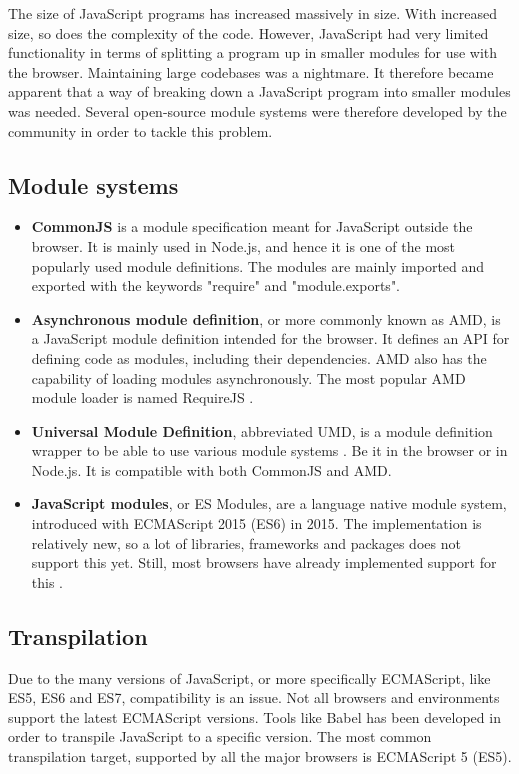 The size of JavaScript programs has increased massively in size. With increased size, so does the complexity of the code. However, JavaScript had very limited functionality in terms of splitting a program up in smaller modules for use with the browser. Maintaining large codebases was a nightmare. It therefore became apparent that a way of breaking down a JavaScript program into smaller modules was needed. Several open-source module systems were therefore developed by the community in order to tackle this problem.

\subsection{Module systems}
\begin{itemize}
    \item \textbf{CommonJS} is a module specification meant for JavaScript outside the browser. It is mainly used in Node.js, and hence it is one of the most popularly used module definitions. The modules are mainly imported and exported with the keywords "require" and "module.exports".
    \item \textbf{Asynchronous module definition}, or more commonly known as AMD, is a JavaScript module definition intended for the browser. It defines an API for defining code as modules, including their dependencies. AMD also has the capability of loading modules asynchronously. The most popular AMD module loader is named RequireJS \cite{requirejs}.
    \item \textbf{Universal Module Definition}, abbreviated UMD, is a module definition wrapper to be able to use various module systems \cite{universal-module-definition}. Be it in the browser or in Node.js. It is compatible with both CommonJS and AMD.
    \item \textbf{JavaScript modules}, or ES Modules, are a language native module system, introduced with ECMAScript 2015 (ES6) in 2015. The implementation is relatively new, so a lot of libraries, frameworks and packages does not support this yet. Still, most browsers have already implemented support for this \cite{es-modules-support}.
\end{itemize}

\subsection{Transpilation}
\label{sec:intro-transpilation}
Due to the many versions of JavaScript, or more specifically ECMAScript, like ES5, ES6 and ES7, compatibility is an issue. Not all browsers and environments support the latest ECMAScript versions. Tools like Babel \cite{babel} has been developed in order to transpile JavaScript to a specific version. The most common transpilation target, supported by all the major browsers is ECMAScript 5 (ES5).

